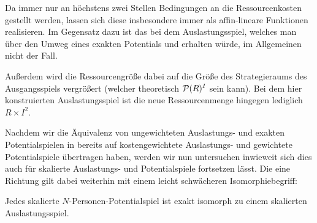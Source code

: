 \begin{beob}
	Da immer nur an höchstens zwei Stellen Bedingungen an die Ressourcenkosten gestellt werden, lassen sich diese insbesondere immer als affin-lineare Funktionen realisieren. Im Gegensatz dazu ist das bei dem Auslastungsspiel, welches man über den Umweg eines exakten Potentials und  erhalten würde, im Allgemeinen nicht der Fall. 
	
	Außerdem wird die Ressourcengröße dabei auf die Größe des Strategieraums des Ausgangsspiels vergrößert (welcher theoretisch $\mathcal{P}(R)^I$ sein kann). Bei dem hier konstruierten Auslastungsspiel ist die neue Ressourcenmenge hingegen lediglich $R \times I^2$.
\end{beob}

Nachdem wir die Äquivalenz von ungewichteten Auslastungs- und exakten Potentialspielen in  bereits auf kostengewichtete Auslastungs- und gewichtete Potentialspiele übertragen haben, werden wir nun untersuchen inwieweit sich dies auch für skalierte Auslastungs- und Potentialspiele fortsetzen lässt. Die eine Richtung gilt dabei weiterhin mit einem leicht schwächeren Isomorphiebegriff:

\begin{satz}
	Jedes skalierte $N$-Personen-Potentialspiel ist exakt isomorph zu einem skalierten Auslastungsspiel.
\end{satz}


